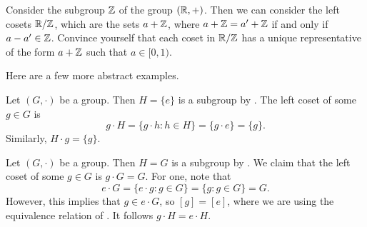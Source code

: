 \documentclass[../notes.tex]{subfiles}
\begin{document}
\begin{example} \label{ex:r-mod-z}
    Consider the subgroup $\mathbb Z$ of the group $(\mathbb R,+)$. Then we can consider the left cosets $\mathbb R/\mathbb Z$, which are the sets $a+\mathbb Z$, where $a+\mathbb Z=a'+\mathbb Z$ if and only if $a-a'\in\mathbb Z$. Convince yourself that each coset in $\mathbb R/\mathbb Z$ has a unique representative of the form $a+\mathbb Z$ such that $a\in[0,1)$.
\end{example}
Here are a few more abstract examples.
\begin{example} \label{ex:trivial-cosets}
    Let $(G,\cdot)$ be a group. Then $H=\{e\}$ is a subgroup by . The left coset of some $g\in G$ is
    \[g\cdot H=\{g\cdot h:h\in H\}=\{g\cdot e\}=\{g\}.\]
    Similarly, $H\cdot g=\{g\}$.
\end{example}
\begin{example}
    Let $(G,\cdot)$ be a group. Then $H=G$ is a subgroup by . We claim that the left coset of some $g\in G$ is $g\cdot G=G$. For one, note that
    \[e\cdot G=\{e\cdot g:g\in G\}=\{g:g\in G\}=G.\]
    However, this implies that $g\in e\cdot G$, so $[g]=[e]$, where we are using the equivalence relation of . It follows $g\cdot H=e\cdot H$.
\end{example}
\end{document}
